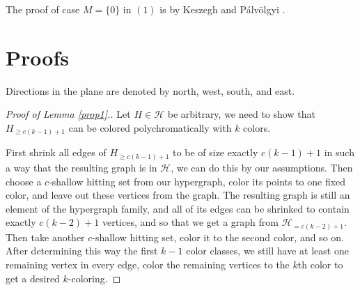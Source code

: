 \documentclass[11pt,oneside]{amsart}
\newcommand{\HH}{\mathcal{H}}
\begin{document}
The proof of case $M=\{0\}$ in $(1)$ is by Keszegh and Pálvölgyi \cite{temavezetes}.

\section{Proofs}

Directions in the plane are denoted by north, west, south, and east.


\begin{proof} [Proof of Lemma \ref{prop1}.] 
Let $H\in\HH$ be arbitrary, we need to show that $H_{\ge c(k-1)+1}$ can be colored polychromatically with $k$ colors.

First shrink all edges of $H_{\ge c(k-1)+1}$ to be of size exactly $c(k-1)+1$ in such a way that the resulting graph is in $\HH$, we can do this by our assumptions.
Then choose a $c$-shallow hitting set from our hypergraph, color its points to one fixed color, and leave out these vertices from the graph. The resulting graph is still an element of the hypergraph family, and all of its edges can be shrinked to contain exactly $c(k-2)+1$ vertices, and so that we get a graph from $\HH_{=c(k-2)+1}$. Then take another $c$-shallow hitting set, color it to the second color, and so on. After determining this way the first $k-1$ color classes, we still have at least one remaining vertex in every edge, color the remaining vertices to the $k$th color to get a desired $k$-coloring.
\end{proof}
\end{document}
